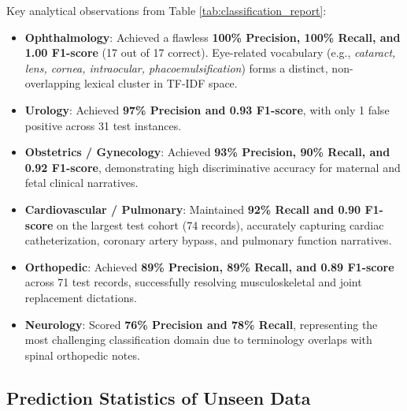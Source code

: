 Key analytical observations from Table \ref{tab:classification_report}:
\begin{itemize}
    \item \textbf{Ophthalmology}: Achieved a flawless \textbf{100\% Precision, 100\% Recall, and 1.00 F1-score} (17 out of 17 correct). Eye-related vocabulary (e.g., \textit{cataract, lens, cornea, intraocular, phacoemulsification}) forms a distinct, non-overlapping lexical cluster in TF-IDF space.
    \item \textbf{Urology}: Achieved \textbf{97\% Precision and 0.93 F1-score}, with only 1 false positive across 31 test instances.
    \item \textbf{Obstetrics / Gynecology}: Achieved \textbf{93\% Precision, 90\% Recall, and 0.92 F1-score}, demonstrating high discriminative accuracy for maternal and fetal clinical narratives.
    \item \textbf{Cardiovascular / Pulmonary}: Maintained \textbf{92\% Recall and 0.90 F1-score} on the largest test cohort (74 records), accurately capturing cardiac catheterization, coronary artery bypass, and pulmonary function narratives.
    \item \textbf{Orthopedic}: Achieved \textbf{89\% Precision, 89\% Recall, and 0.89 F1-score} across 71 test records, successfully resolving musculoskeletal and joint replacement dictations.
    \item \textbf{Neurology}: Scored \textbf{76\% Precision and 78\% Recall}, representing the most challenging classification domain due to terminology overlaps with spinal orthopedic notes.
\end{itemize}

\subsection{Prediction Statistics of Unseen Data}

